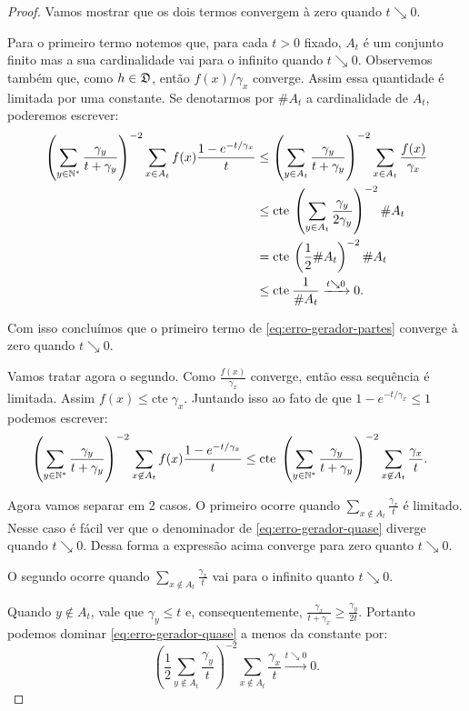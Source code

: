 \begin{proof}
  Vamos mostrar que os dois termos convergem à zero quando $t
  \searrow 0$.

  Para o primeiro termo notemos que, para cada $t > 0$ fixado, $A_t$ é
  um conjunto finito mas a sua cardinalidade vai para o infinito
  quando $t \searrow 0$. Observemos também que, como $h \in {\mathfrak{D}}$,
  então $f(x)/\gamma_x$ converge. Assim essa quantidade é limitada por
  uma constante. Se denotarmos por $\#A_t$ a cardinalidade de $A_t$,
  poderemos escrever:
  \begin{align*}
    \left( \sum_{y \in {\mathbb{N^*}}} \frac{\gamma_y}{t + \gamma_y} \right)^{-2}
    \sum_{x \in A_t} f(x) \frac{1 - e^{-t/\gamma_x}}{t}
    &\leq
    \left( \sum_{y \in A_t} \frac{\gamma_y}{t + \gamma_y} \right)^{-2}
    \sum_{x \in A_t} \frac{f(x)}{\gamma_x}\\
    &\leq \mathrm{cte} \:
    \left( \sum_{y \in A_t} \frac{\gamma_y}{2 \gamma_y} \right)^{-2}
    \# A_t\\
    &= \mathrm{cte} \:
    \left( \frac{1}{2} \# A_t \right)^{-2}
    \# A_t\\
    &\leq \mathrm{cte} \: \frac{1}{\#A_t}
    \xrightarrow{t \searrow 0} 0.
  \end{align*}

  Com isso concluímos que o primeiro termo de
  \eqref{eq:erro-gerador-partes} converge à zero quando $t \searrow
  0$.

  Vamos tratar agora o segundo. Como $\frac{f(x)}{\gamma_x}$ converge,
  então essa sequência é limitada. Assim $f(x) \leq \mathrm{cte}\;
  \gamma_x$. Juntando isso ao fato de que $1 - e^{-t/\gamma_x} \leq 1$
  podemos escrever:
  \begin{align}
    \label{eq:erro-gerador-quase}
    \left( \sum_{y \in {\mathbb{N^*}}} \frac{\gamma_y}{t + \gamma_y} \right)^{-2}
    \sum_{x \not\in A_t} f(x) \frac{1 - e^{-t/\gamma_x}}{t}
    & \leq \mathrm{cte} \;
    \left( \sum_{y \in {\mathbb{N^*}}} \frac{\gamma_y}{t + \gamma_y} \right)^{-2}
    \sum_{x \not\in A_t} \frac{\gamma_x}{t}.
  \end{align}

  Agora vamos separar em 2 casos.  O primeiro ocorre quando $\sum_{x
    \not\in A_t} \frac{\gamma_x}{t}$ é limitado. Nesse caso é fácil
  ver que o denominador de \eqref{eq:erro-gerador-quase} diverge
  quando $t\searrow 0$. Dessa forma a expressão acima converge para zero
  quanto $t \searrow 0$.


  O segundo ocorre quando $\sum_{x \not\in A_t} \frac{\gamma_x}{t}$
  vai para o infinito quanto $t \searrow 0$.

  Quando $y \not\in A_t$, vale que $\gamma_y \leq t$ e,
  consequentemente, $\frac{\gamma_x}{t+\gamma_x} \geq \frac{\gamma_y}{2
    t}$. Portanto podemos dominar \eqref{eq:erro-gerador-quase} a
  menos da constante por:
  \begin{displaymath}
    \left(
      \frac{1}{2} \sum_{y \not\in A_t} \frac{\gamma_y}{t}
    \right)^{-2}
    \sum_{x \not\in A_t} \frac{\gamma_x}{t} \xrightarrow{t \searrow 0} 0.
  \end{displaymath}
\end{proof}

